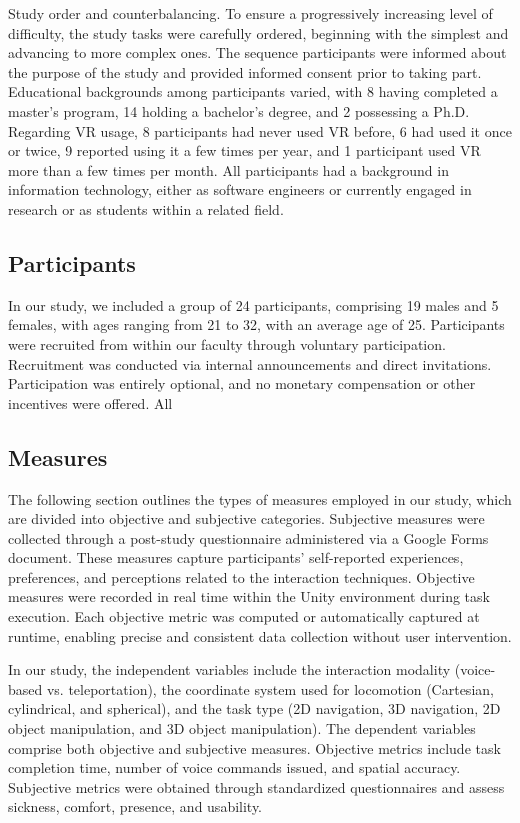 \documentclass[preprint,12pt]{elsarticle}
\newcommand{\reftext}[1]{{\color{gray}#1}}   %
\begin{document}
\reftext{Study order and counterbalancing. To ensure a progressively increasing level of difficulty, the study tasks were carefully ordered, beginning with the simplest and advancing to more complex ones. The sequence participants were informed about the purpose of the study and provided informed consent prior to taking part. Educational backgrounds among participants varied, with 8 having completed a master's program, 14 holding a bachelor's degree, and 2 possessing a Ph.D. Regarding VR usage, 8 participants had never used VR before, 6 had used it once or twice, 9 reported using it a few times per year, and 1 participant used VR more than a few times per month. All participants had a background in information technology, either as software engineers or currently engaged in research or as students within a related field.}

\subsection{Participants}
\reftext{In our study, we included a group of 24 participants, comprising 19 males and 5 females, with ages ranging from 21 to 32, with an average age of 25. Participants were recruited from within our faculty through voluntary participation. Recruitment was conducted via internal announcements and direct invitations. Participation was entirely optional, and no monetary compensation or other incentives were offered. All}

\subsection{Measures}
\reftext{The following section outlines the types of measures employed in our study, which are divided into objective and subjective categories. Subjective measures were collected through a post-study questionnaire administered via a Google Forms document. These measures capture participants' self-reported experiences, preferences, and perceptions related to the interaction techniques. Objective measures were recorded in real time within the Unity environment during task execution. Each objective metric was computed or automatically captured at runtime, enabling precise and consistent data collection without user intervention.}

\reftext{In our study, the independent variables include the interaction modality (voice-based vs. teleportation), the coordinate system used for locomotion (Cartesian, cylindrical, and spherical), and the task type (2D navigation, 3D navigation, 2D object manipulation, and 3D object manipulation). The dependent variables comprise both objective and subjective measures. Objective metrics include task completion time, number of voice commands issued, and spatial accuracy. Subjective metrics were obtained through standardized questionnaires and assess sickness, comfort, presence, and usability.}
\end{document}
